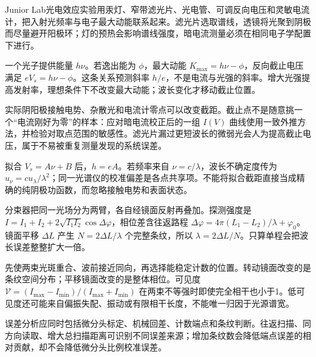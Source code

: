 Junior Lab光电效应实验用汞灯、窄带滤光片、光电管、可调反向电压和灵敏电流计，把入射光频率与电子最大动能联系起来。滤光片选取谱线，透镜将光聚到阴极而尽量避开阳极环；灯的预热会影响谱线强度，暗电流测量必须在相同电子学配置下进行。

一个光子提供能量 $h\nu$。若逸出能为 $\phi$，最大动能 $K_{\max}=h\nu-\phi$，反向截止电压满足 $eV_s=h\nu-\phi$。这条关系预测斜率 $h/e$，不是电流与光强的斜率。增大光强提高发射率，理想条件下不改变最大动能；波长变化才移动截止位置。

实际阴阳极接触电势、杂散光和电流计零点可以改变截距。截止点不是随意挑一个“电流刚好为零”的样本：应对暗电流校正后的一组 $I(V)$ 曲线使用一致外推方法，并检验对取点范围的敏感性。滤光片漏过更短波长的微弱光会人为提高截止电压，属于不易被重复测量发现的系统误差。

拟合 $V_s=A\nu+B$ 后，$h=eA$。若频率来自 $\nu=c/\lambda$，波长不确定度传为 $u_\nu=c u_\lambda/\lambda^2$；同一光谱仪的校准偏差是各点共享项。不能将拟合截距直接当成精确的纯阴极功函数，而忽略接触电势和表面状态。

\begin{center}\end{center}

分束器把同一光场分为两臂，各自经镜面反射再叠加。探测强度是 $I=I_1+I_2+2\sqrt{I_1I_2}\cos\Delta\varphi$，相位差含往返路程 $\Delta\varphi=4\pi(L_1-L_2)/\lambda+\varphi_0$。镜面平移 $\Delta L$ 产生 $N=2\Delta L/\lambda$ 个完整条纹，所以 $\lambda=2\Delta L/N$。只算单程会把波长误差整整扩大一倍。

先使两束光斑重合、波前接近同向，再选择能稳定计数的位置。转动镜面改变的是条纹空间分布；平移镜面改变的是整体相位。可见度 $\mathcal V=(I_{\max}-I_{\min})/(I_{\max}+I_{\min})$ 在两束不等强时即使完全相干也小于1。低可见度还可能来自偏振失配、振动或有限相干长度，不能唯一归因于光源谱宽。

误差分析应同时包括微分头标定、机械回差、计数端点和条纹判断。往返扫描、同方向读取、增大总扫描距离可识别不同误差来源；增加条纹数会降低端点误差的相对贡献，却不会降低微分头比例校准误差。

